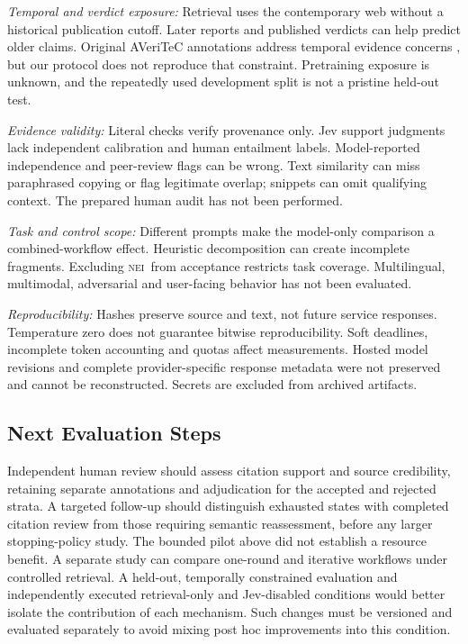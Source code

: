 \documentclass[conference]{IEEEtran}
\newcommand{\NEI}{\textsc{nei}}
\begin{document}
\textit{Temporal and verdict exposure:} Retrieval uses the contemporary web without a historical publication cutoff. Later reports and published verdicts can help predict older claims. Original AVeriTeC annotations address temporal evidence concerns \cite{averitec}, but our protocol does not reproduce that constraint. Pretraining exposure is unknown, and the repeatedly used development split is not a pristine held-out test.

\textit{Evidence validity:} Literal checks verify provenance only. Jev support judgments lack independent calibration and human entailment labels. Model-reported independence and peer-review flags can be wrong. Text similarity can miss paraphrased copying or flag legitimate overlap; snippets can omit qualifying context. The prepared human audit has not been performed.

\textit{Task and control scope:} Different prompts make the model-only comparison a combined-workflow effect. Heuristic decomposition can create incomplete fragments. Excluding \NEI\ from acceptance restricts task coverage. Multilingual, multimodal, adversarial and user-facing behavior has not been evaluated.

\textit{Reproducibility:} Hashes preserve source and text, not future service responses. Temperature zero does not guarantee bitwise reproducibility. Soft deadlines, incomplete token accounting and quotas affect measurements. Hosted model revisions and complete provider-specific response metadata were not preserved and cannot be reconstructed. Secrets are excluded from archived artifacts.

\subsection{Next Evaluation Steps}
Independent human review should assess citation support and source credibility, retaining separate annotations and adjudication for the accepted and rejected strata. A targeted follow-up should distinguish exhausted states with completed citation review from those requiring semantic reassessment, before any larger stopping-policy study. The bounded pilot above did not establish a resource benefit. A separate study can compare one-round and iterative workflows under controlled retrieval. A held-out, temporally constrained evaluation and independently executed retrieval-only and Jev-disabled conditions would better isolate the contribution of each mechanism. Such changes must be versioned and evaluated separately to avoid mixing post hoc improvements into this condition.
\end{document}
